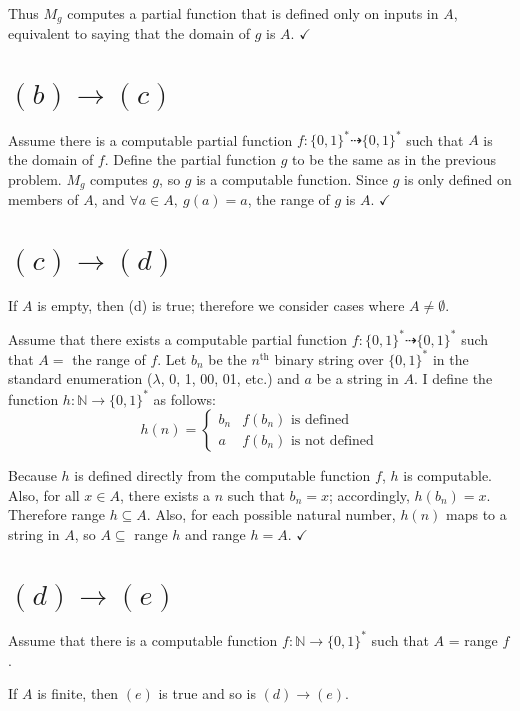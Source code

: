 \documentclass[11pt]{article}
\let\imp\rightarrow
\begin{document}
Thus $M_g$ computes a partial function that is defined only on inputs in $A$, equivalent to saying that the domain of $g$ is $A$. $\checkmark$


\section*{$(b) \imp (c)$}

Assume there is a computable partial function $f: \{0,1\}^* \dashrightarrow \{0,1\}^*$ such that $A$ is the domain of $f$.
Define the partial function $g$ to be the same as in the previous problem.
$M_g$ computes $g$, so $g$ is a computable function.
Since $g$ is only defined on members of $A$, and $ \forall a \in A,\ g(a) = a$, the range of $g$ is $A$. $\checkmark$


\section*{$(c) \imp (d)$}

If $A$ is empty, then (d) is true; therefore we consider cases where $A \neq \emptyset$.

Assume that there exists a computable partial function $f : \{0,1\}^* \dashrightarrow \{0,1\}^*$ such that $A = $ the range of $f$.
Let $b_n$ be the $n^{\text{th}}$ binary string over $\{0,1\}^*$ in the standard enumeration ($\lambda$, 0, 1, 00, 01, etc.) and $a$ be a string in $A$.
I define the function $h : \mathbb{N} \imp \{0,1\}^*$ as follows:
\[ h(n) =
	\begin{cases}
		b_n & f(b_n) \text{ is defined} \\
		a & f(b_n) \text{ is not defined}
	\end{cases}
\]

Because $h$ is defined directly from the computable function $f$, $h$ is computable.
Also, for all $x\in A$, there exists a $n$ such that $b_n = x$; accordingly, $h(b_n) = x$. 
Therefore range $h \subseteq A$.
Also, for each possible natural number, $h(n)$ maps to a string in $A$, so $A \subseteq $ range $h$ and range $h = A$. $\checkmark$


\section*{$(d) \imp (e)$}
Assume that there is a computable function $f : \mathbb{N} \imp \{0,1\}^*$ such that $A$ = range $f$.

If $A$ is finite, then $(e)$ is true and so is $(d) \imp (e)$.
\end{document}
